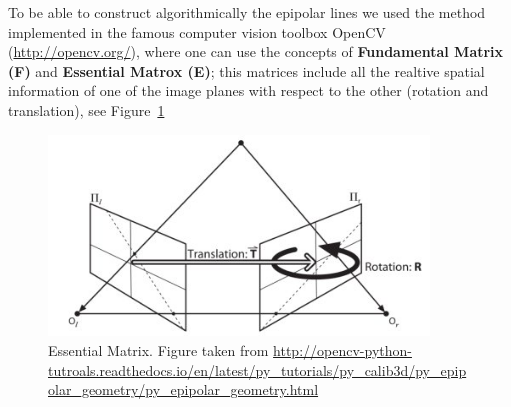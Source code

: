 \bigskip

To be able to construct algorithmically the epipolar lines we used the method implemented in the famous computer vision toolbox OpenCV (\url{http://opencv.org/}), where one can use the concepts of \textbf{Fundamental Matrix (F)} and \textbf{Essential Matrox (E)}; this matrices include all the realtive spatial information of one of the image planes with respect to the other (rotation and translation), see Figure~\ref{fig:essential_matrix.jpg}

\begin{figure}[h!]
\centering
\includegraphics[width = 0.9\textwidth]{./Diagrams/essential_matrix.jpg}
\caption{Essential Matrix. Figure taken from \url{http://opencv-python-tutroals.readthedocs.io/en/latest/py_tutorials/py_calib3d/py_epipolar_geometry/py_epipolar_geometry.html}}
\label{fig:essential_matrix.jpg}
\end{figure}

